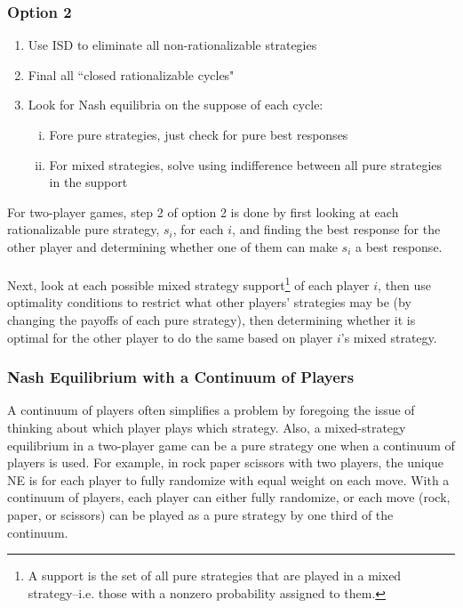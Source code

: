 \documentclass{article}
\begin{document}
\subsubsection*{Option 2}
\begin{enumerate}
	\item Use ISD to eliminate all non-rationalizable strategies 
	\item Final all ``closed rationalizable cycles" 
	\item Look for Nash equilibria on the suppose of each cycle:
		\begin{enumerate}[(i)]
			\item Fore pure strategies, just check for pure best responses
			\item For mixed strategies, solve using indifference between all pure strategies in the support
		\end{enumerate}
\end{enumerate}
For two-player games, step 2 of option 2 is done by first looking at each rationalizable pure strategy, $s_i$, for each $i$, and finding the best response for the other player and determining whether one of them can make $s_i$ a best response. \\
\\
Next, look at each possible mixed strategy support\footnote{A support is the set of all pure strategies that are played in a mixed strategy--i.e. those with a nonzero probability assigned to them.} of each player $i$, then use optimality conditions to restrict what other players' strategies may be (by changing the payoffs of each pure strategy), then determining whether it is optimal for the other player to do the same based on player $i$'s mixed strategy.

\subsubsection{Nash Equilibrium with a Continuum of Players}
A continuum of players often simplifies a problem by foregoing the issue of thinking about which player plays which strategy. Also, a mixed-strategy equilibrium in a two-player game can be a pure strategy one when a continuum of players is used. For example, in rock paper scissors with two players, the unique NE is for each player to fully randomize with equal weight on each move. With a continuum of players, each player can either fully randomize, or each move (rock, paper, or scissors) can be played as a pure strategy by one third of the continuum.
\end{document}
